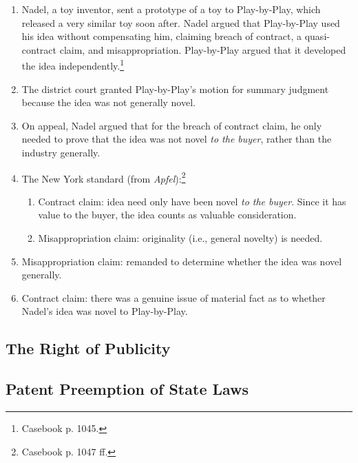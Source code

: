 \begin{enumerate}
    \item Nadel, a toy inventor, sent a prototype of a toy to Play-by-Play, 
    which released a very similar toy soon after. Nadel argued that 
    Play-by-Play used his idea without compensating him, claiming breach of 
    contract, a quasi-contract claim, and misappropriation. Play-by-Play 
    argued that it developed the idea independently.\footnote{Casebook p. 
    1045.}
    \item The district court granted Play-by-Play's motion for summary 
    judgment because the idea was not generally novel.
    \item On appeal, Nadel argued that for the breach of contract claim, he 
    only needed to prove that the idea was not novel \emph{to the buyer}, 
    rather than the industry generally.
    \item The New York standard (from \emph{Apfel}):\footnote{Casebook p. 1047 
    ff.}
    \begin{enumerate}
        \item Contract claim: idea need only have been novel \emph{to the 
        buyer}. Since it has value to the buyer, the idea counts as valuable 
        consideration.
        \item Misappropriation claim: originality (i.e., general novelty) is 
        needed.
    \end{enumerate}
    \item Misappropriation claim: remanded to determine whether the idea was 
    novel generally.
    \item Contract claim: there was a genuine issue of material fact as to 
    whether Nadel's idea was novel to Play-by-Play.
\end{enumerate}

\subsection{The Right of Publicity}


\subsection{Patent Preemption of State Laws}

